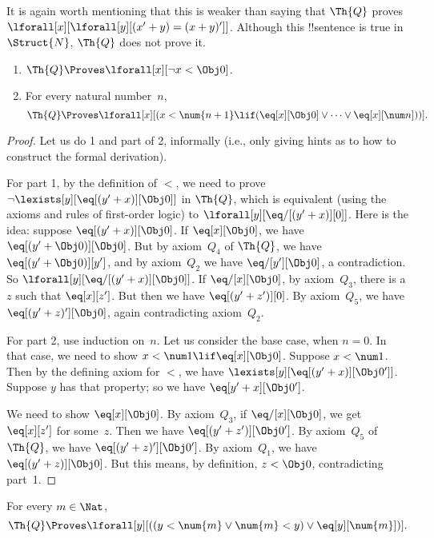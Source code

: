 \documentclass[../../../include/open-logic-section]{subfiles}
\begin{document}
It is again worth mentioning that this is weaker than saying that
$\Th{Q}$ proves $\lforall[x][\lforall[y][(x' + y) = (x + y)']]$.
Although this !!{sentence} is true in~$\Struct{N}$, $\Th{Q}$ does not
prove it.

\begin{lem}
\begin{enumerate}
\item $\Th{Q} \Proves \lforall[x][\lnot x < \Obj 0]$.
\item For every natural number~$n$, 
  \[
  \Th{Q} \Proves
  \lforall[x][(x < \num {n+1} \lif (\eq[x][\Obj 0] \lor \dots \lor
    \eq[x][\num n]))].
  \]
\end{enumerate}
\end{lem}

\begin{proof}
Let us do 1 and part of 2, informally (i.e., only giving hints as to
how to construct the formal derivation).

For part 1, by the definition of $<$, we need to prove $\lnot
\lexists[y][\eq[(y'+x)][\Obj 0]]$ in $\Th{Q}$, which is equivalent
(using the axioms and rules of first-order logic) to
$\lforall[y][\eq/[(y' + x)][0]]$. Here is the idea: suppose
$\eq[(y'+x)][\Obj 0]$. If $\eq[x][\Obj 0]$, we have $\eq[(y' + \Obj
  0)][\Obj 0]$. But by axiom~$Q_4$ of $\Th{Q}$, we have $\eq[(y' +
  \Obj 0)][y']$, and by axiom~$Q_2$ we have $\eq/[y'][\Obj 0]$, a
contradiction. So $\lforall[y][\eq/[(y' +x)][\Obj 0]]$. If
$\eq/[x][\Obj 0]$, by axiom~$Q_3$, there is a $z$ such that
$\eq[x][z']$. But then we have $\eq[(y' + z')][0]$. By axiom~$Q_5$, we
have $\eq[(y' + z)'][\Obj 0]$, again contradicting axiom~$Q_2$.

For part 2, use induction on~$n$. Let us consider the base case, when
$n = 0$. In that case, we need to show $x < \num 1 \lif \eq[x][\Obj
  0]$. Suppose $x < \num 1$. Then by the defining axiom for $<$, we
have $\lexists[y][\eq[(y'+x)][\Obj 0']]$. Suppose $y$ has that property; so
we have $\eq[y'+x][\Obj 0']$.

We need to show $\eq[x][\Obj 0]$. By axiom~$Q_3$, if $\eq/[x][\Obj 0]$,
we get $\eq[x][z']$ for some~$z$. Then we have $\eq[(y' + z')][\Obj
  0']$. By axiom~$Q_5$ of $\Th{Q}$, we have $\eq[(y'+z)'][\Obj
  0']$. By axiom~$Q_1$, we have $\eq[(y' + z)][\Obj 0]$. But this means, by
definition, $z < \Obj 0$, contradicting part~1.
\end{proof}

\begin{lem}
   For every $m \in \Nat$,
  \[
  \Th{Q} \Proves
  \lforall[y][((y < \num{m} \lor \num{m} < y) \lor \eq[y][\num{m}])].
  \]
\end{lem}
\end{document}
